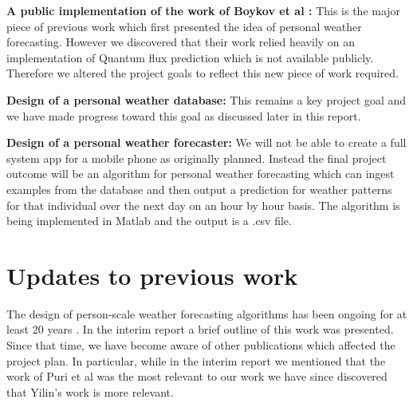 \documentclass[11pt, a4paper]{article}
\begin{document}
{\noindent \bf A public implementation of the work of Boykov et al \cite{boykov_2001} : } This is the major piece of previous work which first presented the idea of personal weather forecasting. However we discovered that their work relied heavily on an implementation of Quantum flux prediction which is not available publicly. Therefore we altered the project goals to reflect this new piece of work required.

{\noindent \bf Design of a personal weather database: } This remains a key project goal and we have made progress toward this goal as discussed later in this report.

{\noindent \bf Design of a personal weather forecaster: } We will not be able to create a full system app for a mobile phone as originally planned. Instead the final project outcome will be an algorithm for personal weather forecasting which can ingest examples from the database and then output a prediction for weather patterns for that individual over the next day on an hour by hour basis. The algorithm is being implemented in Matlab and the output is a .csv file.

\section{Updates to previous work}

The design of person-scale weather forecasting algorithms has been ongoing for at least 20 years \cite{dirac, xu_2013,haskell_1976}. In the interim report a brief outline of this work was presented. Since that time, we have become aware of other publications which affected the project plan. In particular, while in the interim report we mentioned that the work of Puri et al \cite{PURI199339} was the most relevant to our work we have since discovered that Yilin's work \cite{liyin_2010} is more relevant. 
\end{document}
